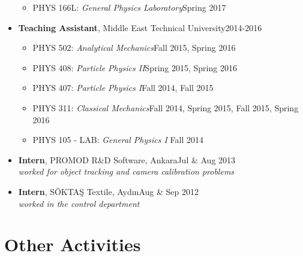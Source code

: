 \documentclass[a4paper,11pt]{article}
\begin{document}
\begin{itemize}[noitemsep,nolistsep]
\begin{itemize}
		\item[] PHYS 166L: \emph{General Physics Laboratory}\hfill Spring 2017\hspace*{2.2em}\vspace*{-.3em}
	\end{itemize} 
	\item[] \textbf{Teaching Assistant}, Middle East Technical University\hfill 2014-2016
	\vspace*{-.3em}
	\begin{itemize}
	\item[] PHYS 502: \emph{Analytical Mechanics}\hfill Fall 2015, Spring 2016\hspace*{2.2em}\vspace*{-.3em}
	\item[] PHYS 408: \emph{Particle Physics II}\hfill Spring 2015, Spring 2016\hspace*{2.2em}\vspace*{-.3em}
	\item[] PHYS 407: \emph{Particle Physics I}\hfill Fall 2014, Fall 2015\hspace*{2.2em}\vspace*{-.3em}
	\item[] PHYS 311: \emph{Classical Mechanics}\hfill Fall 2014, Spring 2015, Fall 2015, Spring 2016\hspace*{2.2em}\vspace*{-.3em}
	\item[] PHYS 105 - LAB: \emph{General Physics I} \hfill Fall 2014\hspace*{2.2em}\vspace*{-.3em}
	\end{itemize} 
	\item[] \textbf{Intern}, PROMOD R\&D Software, Ankara\hfill Jul \& Aug 2013\\	\hspace*{1.8em}\emph{worked for object tracking and camera calibration problems}
\vspace*{-.3em}
	\item[] \textbf{Intern}, SÖKTAŞ Textile, Aydın\hfill Aug \& Sep 2012\\	\hspace*{1.8em}\emph{worked in the control department}
\end{itemize}

\section{\textcolor{burntorange}{Other Activities}}
\end{document}
